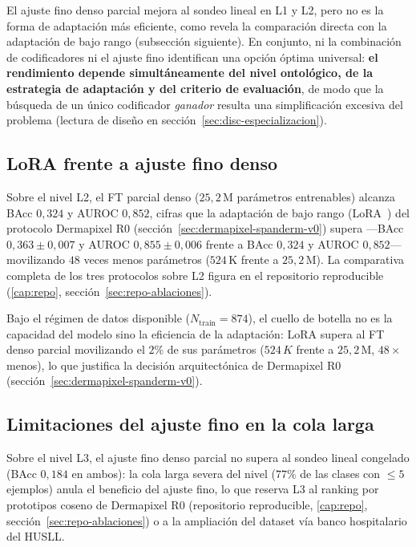 El ajuste fino denso parcial mejora al sondeo lineal en L1 y L2, pero
no es la forma de adaptación más eficiente, como revela la comparación
directa con la adaptación de bajo rango (subsección siguiente). En
conjunto, ni la combinación de codificadores ni el ajuste fino
identifican una opción óptima universal: \textbf{el rendimiento
depende simultáneamente del nivel ontológico, de la estrategia de
adaptación y del criterio de evaluación}, de modo que la búsqueda de un
único codificador \emph{ganador} resulta una simplificación excesiva
del problema (lectura de diseño en
sección~\ref{sec:disc-especializacion}).

\subsection{LoRA frente a ajuste fino denso}

Sobre el nivel L2, el FT parcial denso ($25{,}2$\,M parámetros
entrenables) alcanza BAcc $0{,}324$ y AUROC $0{,}852$, cifras que la
adaptación de bajo rango (LoRA~\cite{lora}) del protocolo Dermapixel
R0 (sección~\ref{sec:dermapixel-spanderm-v0}) supera ---BAcc
$0{,}363 \pm 0{,}007$ y AUROC $0{,}855 \pm 0{,}006$ frente a BAcc
$0{,}324$ y AUROC $0{,}852$--- movilizando $48$ veces menos parámetros
($524$\,K frente a $25{,}2$\,M). La comparativa completa de los tres
protocolos sobre L2 figura en el repositorio reproducible
(\ref{cap:repo}, sección~\ref{sec:repo-ablaciones}).

Bajo el régimen de datos disponible ($N_{\mathrm{train}} = 874$), el
cuello de botella no es la capacidad del modelo sino la eficiencia de
la adaptación: LoRA supera al FT denso parcial movilizando el $2\%$ de
sus parámetros ($524\,K$ frente a $25{,}2$\,M, $48\times$ menos), lo
que justifica la decisión arquitectónica de Dermapixel R0
(sección~\ref{sec:dermapixel-spanderm-v0}).

\subsection{Limitaciones del ajuste fino en la cola larga}

Sobre el nivel L3, el ajuste fino denso parcial no supera al sondeo
lineal congelado (BAcc $0{,}184$ en ambos): la cola larga severa del
nivel ($77\%$ de las clases con $\leq 5$ ejemplos) anula el beneficio
del ajuste fino, lo que reserva L3 al ranking por prototipos coseno de
Dermapixel R0 (repositorio reproducible, \ref{cap:repo}, sección~\ref{sec:repo-ablaciones}) o a la
ampliación del dataset vía banco hospitalario del HUSLL.

